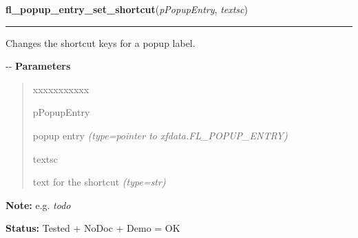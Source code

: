     \vspace{0.5ex}

\hspace{.8\funcindent}\begin{boxedminipage}{\funcwidth}

    \raggedright \textbf{fl\_popup\_entry\_set\_shortcut}(\textit{pPopupEntry}, \textit{textsc})

    \vspace{-1.5ex}

    \rule{\textwidth}{0.5\fboxrule}
\setlength{\parskip}{2ex}

Changes the shortcut keys for a popup label.

-{}-
\setlength{\parskip}{1ex}
      \textbf{Parameters}
      \vspace{-1ex}

      \begin{quote}
        \begin{Ventry}{xxxxxxxxxxx}

          \item[pPopupEntry]


popup entry
            {\it (type=pointer to xfdata.FL\_POPUP\_ENTRY)}

          \item[textsc]


text for the shortcut
            {\it (type=str)}

        \end{Ventry}

      \end{quote}

\textbf{Note:} 
e.g. \emph{todo}


\textbf{Status:} 
Tested + NoDoc + Demo = OK


    \end{boxedminipage}

    \label{xformslib:flpopup:fl_popup_entry_set_value}

    \vspace{0.5ex}


